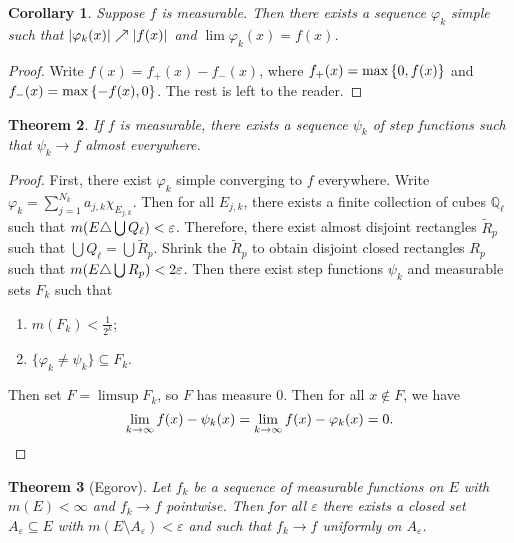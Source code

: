 \documentclass[leqno, openany]{memoir}
\newtheorem{thm}{Theorem}[chapter]
\newtheorem{cor}[thm]{Corollary}
\theoremstyle{definition}
\theoremstyle{remark}
\theoremstyle{plain}
\theoremstyle{definition}
\theoremstyle{remark}
\newcommand{\Q}{\mathbb{Q}}
\newcommand{\ep}{\varepsilon}
\newcommand{\wt}[1]{\widetilde{#1}}
\begin{document}
\begin{cor}
    Suppose $f$ is measurable. Then there exists a sequence $\varphi_k$ simple such that $\abs{\varphi_k(x)} \nearrow \abs{f(x)}$ and $\lim \varphi_k(x) = f(x)$.
\end{cor}

\begin{proof}
    Write $f(x) = f_+(x) - f_-(x)$, where $f_+(x) = \max \qty{0,f(x)}$ and $f_-(x) = \max \qty{-f(x),0}$. The rest is left to the reader.
\end{proof}

\begin{thm}
    If $f$ is measurable, there exists a sequence $\psi_k$ of step functions such that $\psi_k \to f$ almost everywhere.
\end{thm}

\begin{proof}
    First, there exist $\varphi_k$ simple converging to $f$ everywhere. Write $\varphi_k = \sum_{j=1}^{N_k} a_{j,k} \chi_{E_{j,k}}$. Then for all $E_{j,k}$, there exists a finite collection of cubes $\Q_{\ell}$ such that $m\qty(E \triangle \bigcup Q_{\ell}) < \ep$. Therefore, there exist almost disjoint rectangles $\wt{R}_p$ such that $\bigcup Q_{\ell} = \bigcup \wt{R}_p$. Shrink the $\wt{R}_p$ to obtain disjoint closed rectangles $R_p$ such that $m\qty(E \triangle \bigcup R_p) < 2 \ep$. Then there exist step functions $\psi_k$ and measurable sets $F_k$ such that
    \begin{enumerate}
        \item $m(F_k) < \frac{1}{2^k}$;
        \item $\{ \varphi_k \neq \psi_k \} \subseteq F_k$.
    \end{enumerate}
    Then set $F = \limsup F_k$, so $F$ has measure $0$. Then for all $x \notin F$, we have
    \[ \lim_{k \to \infty} f(x) - \psi_k(x) = \lim_{k \to \infty} f(x) - \varphi_k(x) = 0. \qedhere \]
\end{proof}

\begin{thm}[Egorov]
    Let $f_k$ be a sequence of measurable functions on $E$ with $m(E) < \infty$ and $f_k \to f$ pointwise. Then for all $\ep$ there exists a closed set $A_{\ep} \subseteq E$ with $m(E \setminus A_{\ep}) < \ep$ and such that $f_k \to f$ uniformly on $A_{\ep}$.
\end{thm}
\end{document}

